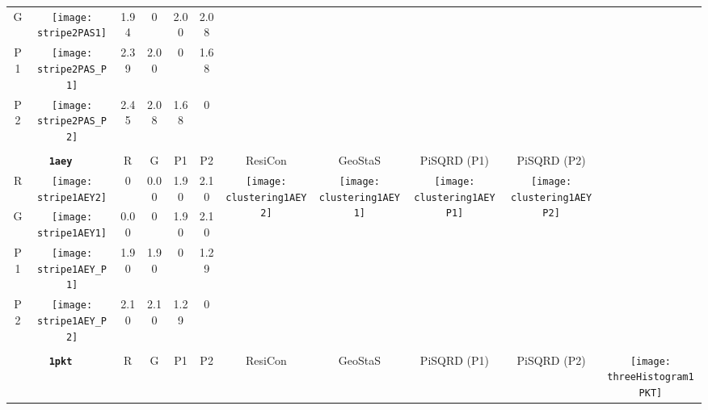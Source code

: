 \documentclass[a4paper,11pt,twoside]{book}%
\begin{document}
\begin{appendices}
\begin{sidewaystable}[h!]
\begin{tabular*}{4cm}{cc|c|c|c|c|c|c|c|c|c|}
\cline{1-6}
\multicolumn{1}{|c|}{G} & \texttt{[image: stripe2PAS1]} & 1.94 & 0 & 2.00 & 2.08 & \multirow{4}{*}{} & \multirow{4}{*}{} & \multirow{4}{*}{} & \multirow{4}{*}{} & \multirow{5}{*}{} \\
\cline{1-6}
\multicolumn{1}{|c|}{P1} & \texttt{[image: stripe2PAS\_P1]} & 2.39 & 2.00 & 0 & 1.68 & \multirow{4}{*}{} & \multirow{4}{*}{} & \multirow{4}{*}{} & \multirow{4}{*}{} & \multirow{5}{*}{}  \\
\cline{1-6}
\multicolumn{1}{|c|}{P2} & \texttt{[image: stripe2PAS\_P2]} & 2.45 & 2.08 & 1.68 & 0 & \multirow{4}{*}{} & \multirow{4}{*}{} & \multirow{4}{*}{} & \multirow{4}{*}{} & \multirow{5}{*}{}  \\
\cline{1-11}
\\
\cline{1-11}
\multicolumn{2}{|c|}{{\bf \texttt{1aey}}} & R & G & P1 & P2 & ResiCon & GeoStaS & PiSQRD (P1) & PiSQRD (P2) & \multirow{5}{*}{\vspace{-0.15cm}\texttt{[image: threeHistogram1AEY]}}  \\
\cline{1-10}
\multicolumn{1}{|c|}{R} & \texttt{[image: stripe1AEY2]} & 0 & 0.00 & 1.90 & 2.10 & \multirow{4}{*}{\vspace{-0.3cm}\texttt{[image: clustering1AEY2]}} & \multirow{4}{*}{\vspace{-0.3cm}\texttt{[image: clustering1AEY1]}} & \multirow{4}{*}{\vspace{-0.3cm}\texttt{[image: clustering1AEYP1]}} & \multirow{4}{*}{\vspace{-0.3cm}\texttt{[image: clustering1AEYP2]}} &  \multirow{5}{*}{} \\
\cline{1-6}
\multicolumn{1}{|c|}{G} & \texttt{[image: stripe1AEY1]} & 0.00 & 0 & 1.90 & 2.10 & \multirow{4}{*}{} & \multirow{4}{*}{} & \multirow{4}{*}{} & \multirow{4}{*}{} & \multirow{5}{*}{} \\
\cline{1-6}
\multicolumn{1}{|c|}{P1} & \texttt{[image: stripe1AEY\_P1]} & 1.90 & 1.90 & 0 & 1.29 & \multirow{4}{*}{} & \multirow{4}{*}{} & \multirow{4}{*}{} & \multirow{4}{*}{} & \multirow{5}{*}{}  \\
\cline{1-6}
\multicolumn{1}{|c|}{P2} & \texttt{[image: stripe1AEY\_P2]} & 2.10 & 2.10 & 1.29 & 0 & \multirow{4}{*}{} & \multirow{4}{*}{} & \multirow{4}{*}{} & \multirow{4}{*}{} & \multirow{5}{*}{}  \\
\cline{1-11}
\\
\cline{1-11}
\multicolumn{2}{|c|}{{\bf \texttt{1pkt}}} & R & G & P1 & P2 & ResiCon & GeoStaS & PiSQRD (P1) & PiSQRD (P2) & \multirow{5}{*}{\vspace{-0.15cm}\texttt{[image: threeHistogram1PKT]}}  \\

\end{tabular*}
\end{sidewaystable}
\end{appendices}
\end{document}
